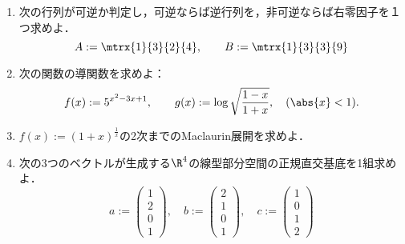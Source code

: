 \documentclass[uplatex,dvipdfmx]{jsarticle}
\begin{document}
\begin{tcolorbox}[colframe=ForestGreen, colback=ForestGreen!10!white,breakable,colbacktitle=ForestGreen!40!white,coltitle=black,fonttitle=\bfseries\sffamily,
    title=第１問]
    \begin{problem}\mbox{}
        \begin{enumerate}[{問}1]
            \item 次の行列が可逆か判定し，可逆ならば逆行列を，非可逆ならば右零因子を１つ求めよ．
            \[A:=\mtrx{1}{3}{2}{4},\qquad B:=\mtrx{1}{3}{3}{9}\]
            \item 次の関数の導関数を求めよ：
            \[f(x):=5^{x^2-3x+1},\qquad g(x):=\log\sqrt{\frac{1-x}{1+x}},\quad(\abs{x}<1).\]
            \item $f(x):=(1+x)^{\frac{1}{x}}$の2次までのMaclaurin展開を求めよ．
            \item 次の3つのベクトルが生成する$\R^4$の線型部分空間の正規直交基底を1組求めよ．
            \[a:=\begin{pmatrix}
                1\\2\\0\\1
            \end{pmatrix},\quad b:=\begin{pmatrix}
                2\\1\\0\\1
            \end{pmatrix},\quad c:=\begin{pmatrix}
                1\\0\\1\\2
            \end{pmatrix}\]
        \end{enumerate}
    \end{problem}
\end{tcolorbox}
\end{document}
